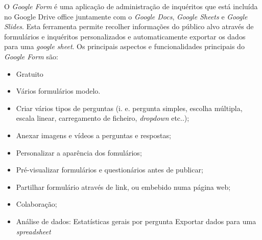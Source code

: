 O \textit{Google Form} é uma aplicação de administração de inquéritos que está incluída no Google Drive office juntamente com o \textit{Google Docs}\cite{gdocs}, \textit{Google Sheets} e \textit{Google Slides}\cite{gslides}. Esta ferramenta permite recolher informações do público alvo através de formulários e inquéritos personalizados e automaticamente exportar os dados para uma \textit{google sheet}. Os principais aspectos e funcionalidades principais do \textit{Google Form}  são:
\begin{itemize}
	\setlength{\itemsep}{1pt}
	\item Gratuito
	\item Vários formulários modelo.
	\item Criar vários tipos de perguntas (i. e. pergunta simples, escolha múltipla, escala linear, carregamento de ficheiro, \textit{dropdown} etc..); 
	\item Anexar imagens e vídeos a perguntas e respostas;
	\item Personalizar a aparência dos fomulários; 
	\item Pré-visualizar formulários e questionários antes de publicar;
	\item Partilhar formulário através de link, ou embebido numa página web;
	\item Colaboração;
	\item Análise de dados:
		\subitem Estatísticas gerais por pergunta
		\subitem Exportar dados para uma \textit{spreadsheet}
\end{itemize}


